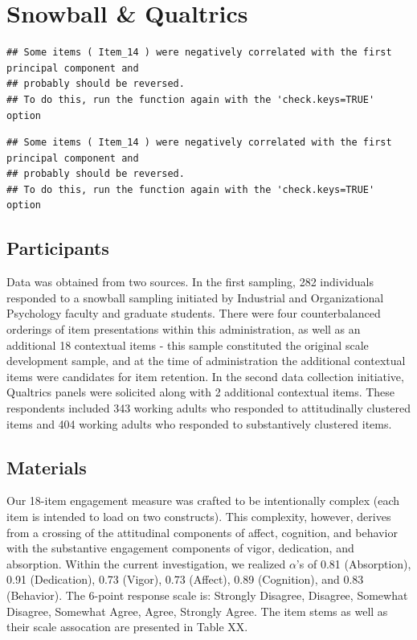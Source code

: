 \documentclass[
  man]{apa7}
\begin{document}
\hypertarget{snowball-qualtrics}{%
\section{Snowball \& Qualtrics}\label{snowball-qualtrics}}

\begin{verbatim}
## Some items ( Item_14 ) were negatively correlated with the first principal component and 
## probably should be reversed.  
## To do this, run the function again with the 'check.keys=TRUE' option
\end{verbatim}

\begin{verbatim}
## Some items ( Item_14 ) were negatively correlated with the first principal component and 
## probably should be reversed.  
## To do this, run the function again with the 'check.keys=TRUE' option
\end{verbatim}

\hypertarget{participants-1}{%
\subsection{Participants}\label{participants-1}}

Data was obtained from two sources. In the first sampling, 282 individuals responded to a snowball sampling initiated by Industrial and Organizational Psychology faculty and graduate students. There were four counterbalanced orderings of item presentations within this administration, as well as an additional 18 contextual items - this sample constituted the original scale development sample, and at the time of administration the additional contextual items were candidates for item retention. In the second data collection initiative, Qualtrics panels were solicited along with 2 additional contextual items. These respondents included 343 working adults who responded to attitudinally clustered items and 404 working adults who responded to substantively clustered items.

\hypertarget{materials}{%
\subsection{Materials}\label{materials}}

Our 18-item engagement measure was crafted to be intentionally complex (each item is intended to load on two constructs). This complexity, however, derives from a crossing of the attitudinal components of affect, cognition, and behavior with the substantive engagement components of vigor, dedication, and absorption. Within the current investigation, we realized \(\alpha\)'s of 0.81 (Absorption), 0.91 (Dedication), 0.73 (Vigor), 0.73 (Affect), 0.89 (Cognition), and 0.83 (Behavior). The 6-point response scale is: Strongly Disagree, Disagree, Somewhat Disagree, Somewhat Agree, Agree, Strongly Agree. The item stems as well as their scale assocation are presented in Table XX.
\end{document}
